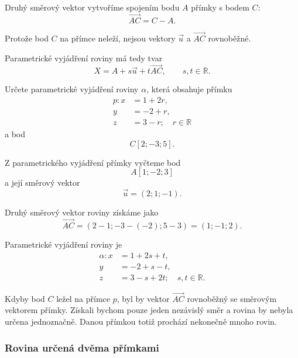 Druhý směrový vektor vytvoříme spojením bodu $A$ přímky s bodem $C$:
\[
    \overrightarrow{AC}=C-A.
\]

Protože bod $C$ na přímce neleží, nejsou vektory $\vec{u}$ a
$\overrightarrow{AC}$ rovnoběžné.

Parametrické vyjádření roviny má tedy tvar
\begin{equation}
    X=A+s\vec{u}+t\overrightarrow{AC},
    \qquad
    s,t\in\mathbb{R}.
    \label{eq:Plane_line_and_point}
\end{equation}

\begin{example}
    \label{exa:Plane_line_and_point}

    Určete parametrické vyjádření roviny $\alpha$, která obsahuje přímku
    \[
        \begin{aligned}
            p: x&=1+2r,\\
            y&=-2+r,\\
            z&=3-r; \quad r\in\mathbb{R}
        \end{aligned}
    \]
    a bod
    \[
        C[2;-3;5].
    \]

    Z parametrického vyjádření přímky vyčteme bod
    \[
        A[1;-2;3]
    \]
    a její směrový vektor
    \[
        \vec{u}=(2;1;-1).
    \]

    Druhý směrový vektor roviny získáme jako
    \[
        \overrightarrow{AC}
        =
        (2-1;-3-(-2);5-3)
        =
        (1;-1;2).
    \]

    Parametrické vyjádření roviny je
    \[
        \begin{aligned}
            \alpha: x&=1+2s+t,\\
            y&=-2+s-t,\\
            z&=3-s+2t; \quad s,t\in\mathbb{R}.
        \end{aligned}
    \]
\end{example}

\begin{remark}
    Kdyby bod $C$ ležel na přímce $p$, byl by vektor
    $\overrightarrow{AC}$ rovnoběžný se směrovým vektorem přímky.
    Získali bychom pouze jeden nezávislý směr a rovina by nebyla
    určena jednoznačně. Danou přímkou totiž prochází nekonečně mnoho
    rovin.
\end{remark}


\subsubsection{Rovina určená dvěma přímkami}
\label{subsubsec:Plane_determined_by_two_lines}

